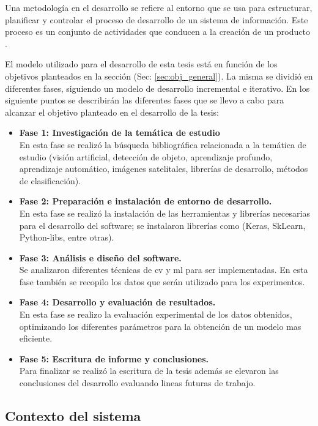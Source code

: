 Una metodología en el desarrollo se refiere al entorno que se usa para estructurar, planificar y controlar el proceso de desarrollo de un sistema de información. Este proceso es un conjunto de actividades que conducen a la creación de un producto \citep{sommerville}.


El modelo utilizado para el desarrollo de esta tesis está en función de los objetivos planteados en la sección (Sec: \ref{sec:obj_general}). La misma se dividió en diferentes fases, siguiendo un modelo de desarrollo incremental e iterativo. En los siguiente puntos se describirán las diferentes fases que se llevo a cabo para alcanzar el objetivo planteado en el desarrollo de la tesis:
\begin{itemize}
	\item \textbf{Fase 1: Investigación de la temática de estudio}\\
	En esta fase se realizó la búsqueda bibliográfica relacionada a la temática de estudio (visión artificial, detección de objeto, 
	aprendizaje profundo, aprendizaje automático, imágenes satelitales, librerías de desarrollo, métodos de clasificación).
	\item \textbf{Fase 2: Preparación e instalación de entorno de desarrollo.}\\
	En esta fase se realizó la instalación de las herramientas y librerías necesarias para el desarrollo del software; se instalaron librerías  
como (Keras, SkLearn, Python-libs, entre otras).
	\item \textbf{Fase 3: Análisis e diseño del software.}\\
	Se analizaron diferentes técnicas de \ac{cv} y \ac{ml} para ser implementadas. En esta fase también se recopilo los datos que serán utilizado para los experimentos.
	\item \textbf{Fase 4: Desarrollo y evaluación de resultados.}\\
	En esta fase se realizo la evaluación experimental de los datos obtenidos, optimizando los diferentes parámetros para la obtención de un 
modelo mas eficiente.
	\item \textbf{Fase 5: Escritura de informe y conclusiones.}\\
	Para finalizar se realizó la escritura de la tesis además se elevaron las conclusiones del desarrollo evaluando lineas futuras de trabajo.
\end{itemize}


\subsection{Contexto del sistema}\label{sub:casodeuso}

